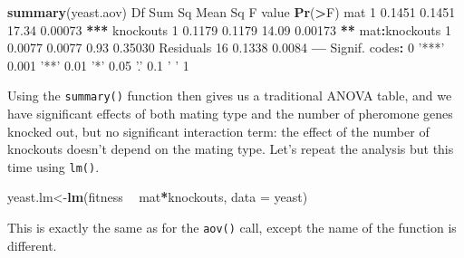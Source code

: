 \documentclass[
]{book}
\newenvironment{Shaded}{\begin{snugshade}}{\end{snugshade}}
\newcommand{\DataTypeTok}[1]{\textcolor[rgb]{0.13,0.29,0.53}{#1}}
\newcommand{\DecValTok}[1]{\textcolor[rgb]{0.00,0.00,0.81}{#1}}
\newcommand{\ErrorTok}[1]{\textcolor[rgb]{0.64,0.00,0.00}{\textbf{#1}}}
\newcommand{\FloatTok}[1]{\textcolor[rgb]{0.00,0.00,0.81}{#1}}
\newcommand{\KeywordTok}[1]{\textcolor[rgb]{0.13,0.29,0.53}{\textbf{#1}}}
\newcommand{\NormalTok}[1]{#1}
\newcommand{\OperatorTok}[1]{\textcolor[rgb]{0.81,0.36,0.00}{\textbf{#1}}}
\newcommand{\StringTok}[1]{\textcolor[rgb]{0.31,0.60,0.02}{#1}}
\begin{document}
\begin{Shaded}
\begin{Highlighting}[]
\KeywordTok{summary}\NormalTok{(yeast.aov)}
\NormalTok{              Df Sum Sq Mean Sq F value  }\KeywordTok{Pr}\NormalTok{(}\OperatorTok{>}\NormalTok{F)    }
\NormalTok{mat            }\DecValTok{1} \FloatTok{0.1451}  \FloatTok{0.1451}   \FloatTok{17.34} \FloatTok{0.00073} \OperatorTok{**}\ErrorTok{*}
\NormalTok{knockouts      }\DecValTok{1} \FloatTok{0.1179}  \FloatTok{0.1179}   \FloatTok{14.09} \FloatTok{0.00173} \OperatorTok{**}\StringTok{ }
\NormalTok{mat}\OperatorTok{:}\NormalTok{knockouts  }\DecValTok{1} \FloatTok{0.0077}  \FloatTok{0.0077}    \FloatTok{0.93} \FloatTok{0.35030}    
\NormalTok{Residuals     }\DecValTok{16} \FloatTok{0.1338}  \FloatTok{0.0084}                    
\OperatorTok{---}
\NormalTok{Signif. codes}\OperatorTok{:}\StringTok{  }\DecValTok{0} \StringTok{'***'} \FloatTok{0.001} \StringTok{'**'} \FloatTok{0.01} \StringTok{'*'} \FloatTok{0.05} \StringTok{'.'} \FloatTok{0.1} \StringTok{' '} \DecValTok{1}
\end{Highlighting}
\end{Shaded}

Using the \texttt{summary()} function then gives us a traditional ANOVA table, and we have significant effects of both mating type and the number of pheromone genes knocked out, but no significant interaction term: the effect of the number of knockouts doesn't depend on the mating type.
Let's repeat the analysis but this time using \texttt{lm()}.

\begin{Shaded}
\begin{Highlighting}[]
\NormalTok{yeast.lm<-}\KeywordTok{lm}\NormalTok{(fitness }\OperatorTok{~}\StringTok{ }\NormalTok{mat}\OperatorTok{*}\NormalTok{knockouts, }\DataTypeTok{data =}\NormalTok{ yeast)}
\end{Highlighting}
\end{Shaded}

This is exactly the same as for the \texttt{aov()} call, except the name of the function is different.
\end{document}
